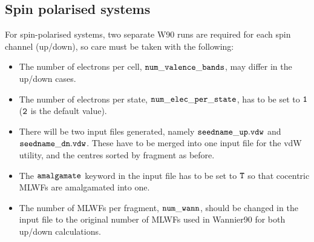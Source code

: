 \documentclass{report}
\begin{document}
\subsection{Spin polarised systems} 

For spin-polarised systems, two separate W90 runs are required for 
each spin channel (up/down), so care must be taken with the following:

\begin{itemize}
\item The number of electrons per cell, $\tt{num\_valence\_bands}$, 
may differ in the up/down cases.

\item The number of electrons per state, $\tt{num\_elec\_per\_state}$, 
has to be set to $\tt{1}$ ($\tt{2}$ is the default value).

\item There will be two input files generated, namely 
$\tt{seedname\_up.vdw}$ and $\tt{seedname\_dn.vdw}$.
These have to be merged into one input file for the 
vdW utility, and the centres sorted by fragment as before. 

\item The $\tt{amalgamate}$ keyword in the input file has to be set 
to $\tt{T}$ so that cocentric MLWFs are amalgamated into one.

\item The number of MLWFs per fragment, $\tt{num\_wann}$, should 
be changed in the input file to the original number of MLWFs used 
in Wannier90 for both up/down calculations.
\end{itemize}
\end{document}
